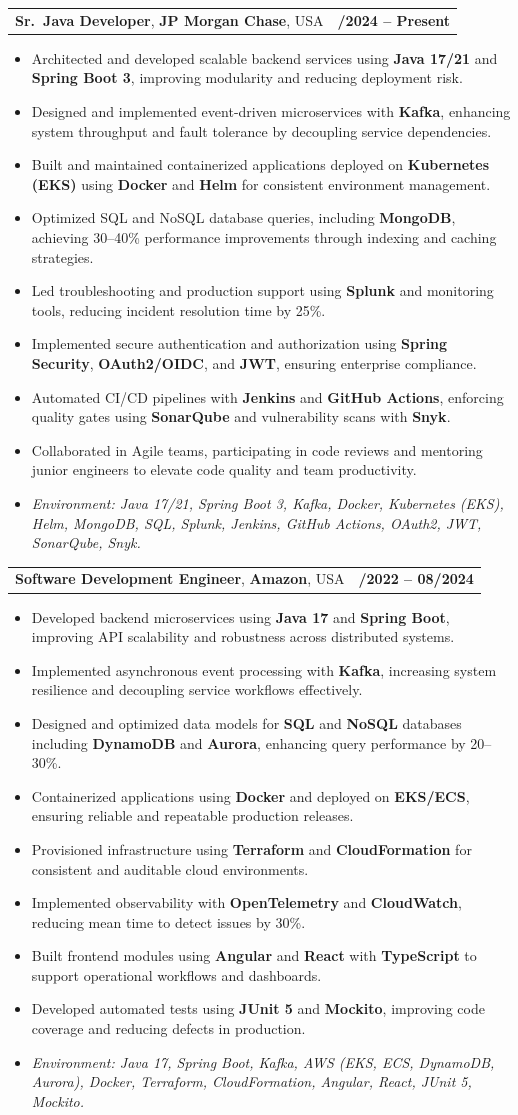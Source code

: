 \documentclass[letterpaper,11pt]{article}
\makeatletter
\newcommand{\resumeItem}[1]{
  \item\footnotesize{
    {#1 \vspace{-2pt}}
  }
}
\newcommand{\resumeSubheading}[4]{
  \vspace{-2pt}\item
    \begin{tabular*}{1.0\textwidth}[t]{l@{\extracolsep{\fill}}r}
      \textbf{\fontsize{10pt}{14pt}\selectfont #3}, \textbf{\fontsize{10pt}{14pt}\selectfont #1}, \fontsize{10pt}{14pt}\selectfont #4 & \textbf{\fontsize{10pt}{14pt}\selectfont #2} \\
    \end{tabular*}\vspace{-7pt}
}
\newcommand{\resumeItemListStart}{\begin{itemize}[leftmargin=*]}
\newcommand{\resumeItemListEnd}{\end{itemize}\vspace{-5pt}}
\makeatother
\begin{document}
\resumeSubheading
{JP Morgan Chase}{09/2024 -- Present}
{Sr.\ Java Developer}{USA}
\resumeItemListStart
  \resumeItem{Architected and developed scalable backend services using \textbf{Java 17/21} and \textbf{Spring Boot 3}, improving modularity and reducing deployment risk.}
  \resumeItem{Designed and implemented event-driven microservices with \textbf{Kafka}, enhancing system throughput and fault tolerance by decoupling service dependencies.}
  \resumeItem{Built and maintained containerized applications deployed on \textbf{Kubernetes (EKS)} using \textbf{Docker} and \textbf{Helm} for consistent environment management.}
  \resumeItem{Optimized SQL and NoSQL database queries, including \textbf{MongoDB}, achieving 30--40\% performance improvements through indexing and caching strategies.}
  \resumeItem{Led troubleshooting and production support using \textbf{Splunk} and monitoring tools, reducing incident resolution time by 25\%.}
  \resumeItem{Implemented secure authentication and authorization using \textbf{Spring Security}, \textbf{OAuth2/OIDC}, and \textbf{JWT}, ensuring enterprise compliance.}
  \resumeItem{Automated CI/CD pipelines with \textbf{Jenkins} and \textbf{GitHub Actions}, enforcing quality gates using \textbf{SonarQube} and vulnerability scans with \textbf{Snyk}.}
  \resumeItem{Collaborated in Agile teams, participating in code reviews and mentoring junior engineers to elevate code quality and team productivity.}
  \resumeItem{\textit{Environment: Java 17/21, Spring Boot 3, Kafka, Docker, Kubernetes (EKS), Helm, MongoDB, SQL, Splunk, Jenkins, GitHub Actions, OAuth2, JWT, SonarQube, Snyk.}}
\resumeItemListEnd

\resumeSubheading
{Amazon}{10/2022 -- 08/2024}
{Software Development Engineer}{USA}
\resumeItemListStart
  \resumeItem{Developed backend microservices using \textbf{Java 17} and \textbf{Spring Boot}, improving API scalability and robustness across distributed systems.}
  \resumeItem{Implemented asynchronous event processing with \textbf{Kafka}, increasing system resilience and decoupling service workflows effectively.}
  \resumeItem{Designed and optimized data models for \textbf{SQL} and \textbf{NoSQL} databases including \textbf{DynamoDB} and \textbf{Aurora}, enhancing query performance by 20--30\%.}
  \resumeItem{Containerized applications using \textbf{Docker} and deployed on \textbf{EKS/ECS}, ensuring reliable and repeatable production releases.}
  \resumeItem{Provisioned infrastructure using \textbf{Terraform} and \textbf{CloudFormation} for consistent and auditable cloud environments.}
  \resumeItem{Implemented observability with \textbf{OpenTelemetry} and \textbf{CloudWatch}, reducing mean time to detect issues by 30\%.}
  \resumeItem{Built frontend modules using \textbf{Angular} and \textbf{React} with \textbf{TypeScript} to support operational workflows and dashboards.}
  \resumeItem{Developed automated tests using \textbf{JUnit 5} and \textbf{Mockito}, improving code coverage and reducing defects in production.}
  \resumeItem{\textit{Environment: Java 17, Spring Boot, Kafka, AWS (EKS, ECS, DynamoDB, Aurora), Docker, Terraform, CloudFormation, Angular, React, JUnit 5, Mockito.}}
\resumeItemListEnd
\end{document}
